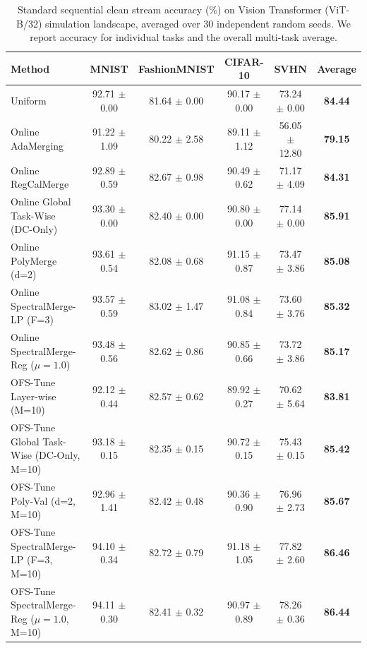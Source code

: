 \begin{table}[t]
\caption{Standard sequential clean stream accuracy (\%) on Vision Transformer (ViT-B/32) simulation landscape, averaged over 30 independent random seeds. We report accuracy for individual tasks and the overall multi-task average.}
\label{tab:standard_eval}
\vskip 0.15in
\begin{center}
\begin{small}
\begin{sc}
\setlength{\tabcolsep}{3.5pt}
\begin{tabular}{lccccc}
\toprule
Method & MNIST & FashionMNIST & CIFAR-10 & SVHN & \textbf{Average} \\
\midrule
Uniform & 92.71 $\pm$ 0.00 & 81.64 $\pm$ 0.00 & 90.17 $\pm$ 0.00 & 73.24 $\pm$ 0.00 & \textbf{84.44} \\
Online AdaMerging & 91.22 $\pm$ 1.09 & 80.22 $\pm$ 2.58 & 89.11 $\pm$ 1.12 & 56.05 $\pm$ 12.80 & \textbf{79.15} \\
Online RegCalMerge & 92.89 $\pm$ 0.59 & 82.67 $\pm$ 0.98 & 90.49 $\pm$ 0.62 & 71.17 $\pm$ 4.09 & \textbf{84.31} \\
Online Global Task-Wise (DC-Only) & 93.30 $\pm$ 0.00 & 82.40 $\pm$ 0.00 & 90.80 $\pm$ 0.00 & 77.14 $\pm$ 0.00 & \textbf{85.91} \\
Online PolyMerge (d=2) & 93.61 $\pm$ 0.54 & 82.08 $\pm$ 0.68 & 91.15 $\pm$ 0.87 & 73.47 $\pm$ 3.86 & \textbf{85.08} \\
\midrule
Online SpectralMerge-LP (F=3) & 93.57 $\pm$ 0.59 & 83.02 $\pm$ 1.47 & 91.08 $\pm$ 0.84 & 73.60 $\pm$ 3.76 & \textbf{85.32} \\
Online SpectralMerge-Reg ($\mu=1.0$) & 93.48 $\pm$ 0.56 & 82.62 $\pm$ 0.86 & 90.85 $\pm$ 0.66 & 73.72 $\pm$ 3.86 & \textbf{85.17} \\
\midrule
OFS-Tune Layer-wise (M=10) & 92.12 $\pm$ 0.44 & 82.57 $\pm$ 0.62 & 89.92 $\pm$ 0.27 & 70.62 $\pm$ 5.64 & \textbf{83.81} \\
OFS-Tune Global Task-Wise (DC-Only, M=10) & 93.18 $\pm$ 0.15 & 82.35 $\pm$ 0.15 & 90.72 $\pm$ 0.15 & 75.43 $\pm$ 0.15 & \textbf{85.42} \\
OFS-Tune Poly-Val (d=2, M=10) & 92.96 $\pm$ 1.41 & 82.42 $\pm$ 0.48 & 90.36 $\pm$ 0.90 & 76.96 $\pm$ 2.73 & \textbf{85.67} \\
\midrule
OFS-Tune SpectralMerge-LP (F=3, M=10) & 94.10 $\pm$ 0.34 & 82.72 $\pm$ 0.79 & 91.18 $\pm$ 1.05 & 77.82 $\pm$ 2.60 & \textbf{86.46} \\
OFS-Tune SpectralMerge-Reg ($\mu=1.0$, M=10) & 94.11 $\pm$ 0.30 & 82.41 $\pm$ 0.32 & 90.97 $\pm$ 0.89 & 78.26 $\pm$ 0.36 & \textbf{86.44} \\
\bottomrule
\end{tabular}
\end{sc}
\end{small}
\end{center}
\vskip -0.1in
\end{table}

